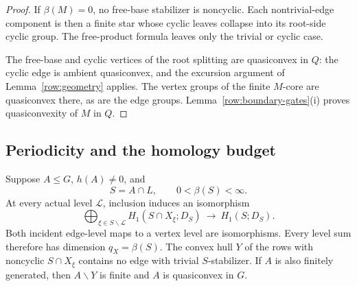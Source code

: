 \begin{proof}
If \(\beta(M)=0\), no free-base stabilizer is noncyclic.
Each nontrivial-edge component is then a finite star whose cyclic
leaves collapse into its root-side cyclic group.
The free-product formula leaves only the trivial or cyclic case.

The free-base and cyclic vertices of the root splitting are
quasiconvex in \(Q\): the cyclic edge is ambient quasiconvex, and
the excursion argument of Lemma~\ref{row:geometry} applies.
The vertex groups of the finite \(M\)-core are quasiconvex there,
as are the edge groups. Lemma~\ref{row:boundary-gates}(i) proves
quasiconvexity of \(M\) in \(Q\).
\end{proof}

\subsection{Periodicity and the homology budget}

\begin{proposition}\label{row:period-rule}
Suppose \(A\leq G\), \(h(A)\neq0\), and
\[
 S=A\cap L,\qquad 0<\beta(S)<\infty.
\]
At every actual level \(\mathscr L\), inclusion induces an isomorphism
\[
 \bigoplus_{\xi\in S\backslash\mathscr L}
 H_1(S\cap X_\xi;D_S)\ \longrightarrow\ H_1(S;D_S).
\]
Both incident edge-level maps to a vertex level are isomorphisms.
Every level sum therefore has dimension \(q_X=\beta(S)\).
The convex hull \(Y\) of the rows with noncyclic \(S\cap X_\xi\)
contains no edge with trivial \(S\)-stabilizer.
If \(A\) is also finitely generated, then \(A\backslash Y\) is finite
and \(A\) is quasiconvex in \(G\).
\end{proposition}

